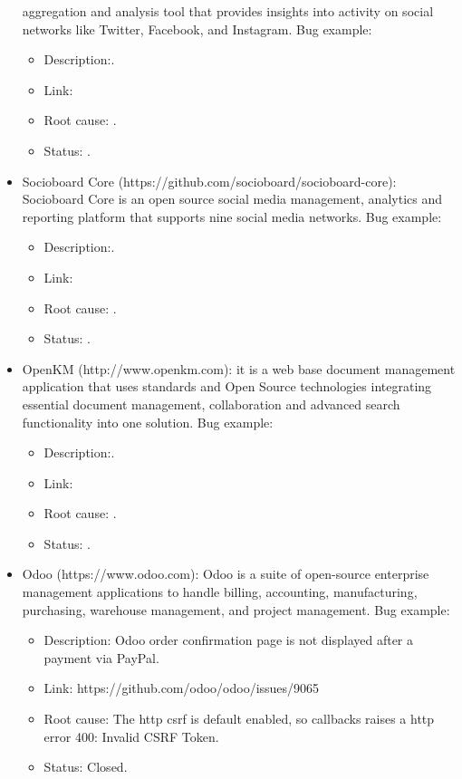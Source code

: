 \begin{itemize}
  aggregation and analysis tool that provides insights into activity on
  social networks like Twitter, Facebook, and Instagram.  Bug example:
  \begin{itemize}
    \item Description:.
    \item Link:
    \item Root cause: .
    \item Status: .
  \end{itemize}
  \item Socioboard Core (https://github.com/socioboard/socioboard-core):
  Socioboard Core is an open source social media management, analytics and reporting platform that supports nine social media
  networks. Bug example:
  \begin{itemize}
    \item Description:.
    \item Link:
    \item Root cause: .
    \item Status: .
  \end{itemize}
  \item OpenKM (http://www.openkm.com): it is a web base document management
  application that uses standards and Open Source technologies integrating
  essential document management, collaboration and advanced search functionality into one solution.  Bug example:
  \begin{itemize}
    \item Description:.
    \item Link:
    \item Root cause: .
    \item Status: .
  \end{itemize}
  \item Odoo (https://www.odoo.com): Odoo is a suite of
  open-source enterprise management applications to handle billing, accounting, manufacturing, purchasing, warehouse
  management, and project management.  Bug example:
  \begin{itemize}
    \item Description: Odoo order confirmation page is not displayed after
    a payment via PayPal.
    \item Link: https://github.com/odoo/odoo/issues/9065
    \item Root cause: The http csrf is default enabled, so callbacks raises a http
    error 400: Invalid CSRF Token.
    \item Status: Closed.
  \end{itemize}
\end{itemize}
